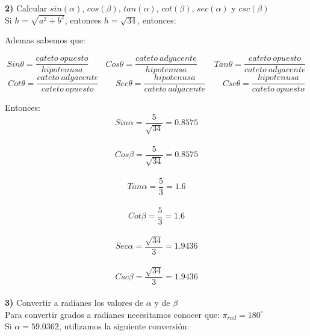\documentclass[11pt]{report}
\begin{document}
\pagebreak \indent \textbf { 2)} Calcular $sin(\alpha)$, $cos(\beta)$, $tan(\alpha)$, $cot(\beta)$, $sec(\alpha)$ y $csc(\beta)$ \\[2mm]
Si $h=\sqrt{a^2+b^2}$, entonces $h=\sqrt{34}$, entonces:
\begin{center}
\end{center}
Ademas sabemos que:

$$Sin\theta=\frac{cateto\:opuesto}{hipotenusa} \qquad Cos\theta=\frac{cateto\:adyacente}{hipotenusa} \qquad Tan\theta=\frac{cateto\:opuesto}{cateto\:adyacente}$$
$$Cot\theta=\frac{cateto\:adyacente}{cateto\:opuesto} \qquad Sec\theta=\frac{hipotenusa}{cateto\:adyacente} \qquad Csc\theta=\frac{hipotenusa}{cateto\:opuesto}$$

Entonces: \\[2mm]
$$Sin\alpha=\dfrac{5}{\sqrt{34}}=0.8575$$ \\[2mm]
$$Cos\beta=\dfrac{5}{\sqrt{34}}=0.8575$$ \\[2mm]
$$Tan\alpha=\dfrac{5}{3}=1.6$$ \\[2mm]
$$Cot\beta=\dfrac{5}{3}=1.6$$ \\[2mm]
$$Sec\alpha=\dfrac{\sqrt{34}}{3}=1.9436$$ \\[2mm]
$$Csc\beta=\dfrac{\sqrt{34}}{3}=1.9436$$ \\[2mm]

\pagebreak \indent \textbf { 3)} Convertir a radianes los valores de $\alpha$ y de $\beta$ \\[2mm]
Para convertir grados a radianes necesitamos conocer que: $\pi_{rad}=180^{\circ}$ \\[2mm]
Si $\alpha=59.0362$, utilizamos la siguiente conversión:
\end{document}
